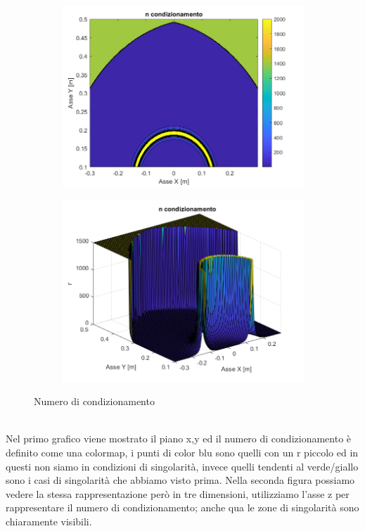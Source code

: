 \begin{figure}[!ht]
	\begin{subfigure}{.55\textwidth}
		\centering
		\includegraphics[width=.9\linewidth]{Immagini/Singolarity/Ncond}
		\label{fig:ncond}
	\end{subfigure}
	\begin{subfigure}{.55\textwidth}
		\centering
		\includegraphics[width=.9\linewidth]{Immagini/Singolarity/Ncond_surf}  
		\label{fig:nconds}
	\end{subfigure}
	\caption{Numero di condizionamento}
	\label{NumCondiz}
\end{figure}
\\Nel primo grafico viene mostrato il piano x,y ed il numero di condizionamento è definito come una colormap, i punti di color blu sono quelli con un r piccolo ed in questi non siamo in condizioni di singolarità, invece quelli tendenti al verde/giallo sono i casi di singolarità che abbiamo visto prima. Nella seconda figura possiamo vedere la stessa rappresentazione però in tre dimensioni, utilizziamo l'asse z per rappresentare il numero di condizionamento; anche qua le zone di singolarità sono chiaramente visibili.

